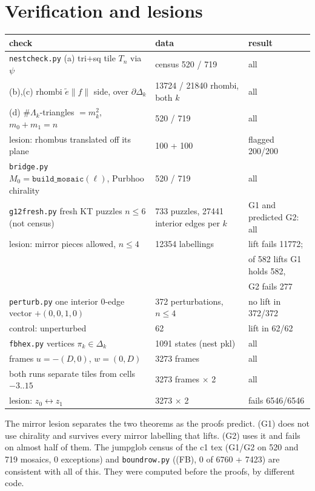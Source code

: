 \documentclass[11pt]{article}
\theoremstyle{definition}\newtheorem{definition}[theorem]{Definition}\newtheorem{remark}[theorem]{Remark}
\begin{document}
\section{Verification and lesions}\label{sec:ver}
\begin{center}\small
\begin{tabular}{lll}
\toprule
check & data & result\\
\midrule
\texttt{nestcheck.py} (a) tri+sq tile $T_n$ via $\psi$ & census 520 / 719 & all\\
\quad (b),(c) rhombi $\tilde e\parallel f\parallel$ side, over $\partial\Delta_k$ & 13724 / 21840 rhombi, both $k$ & all\\
\quad (d) $\#\Lambda_k$-triangles $=m_k^2$, $m_0+m_1=n$ & 520 / 719 & all\\
\quad lesion: rhombus translated off its plane & 100 + 100 & flagged 200/200\\
\texttt{bridge.py} $M_0=\texttt{build\_mosaic}(\ell)$, Purbhoo chirality & 520 / 719 & all\\
\texttt{g12fresh.py} fresh KT puzzles $n\le6$ (not census) & 733 puzzles, 27441 interior edges per $k$ & G1 and predicted G2: all\\
\quad lesion: mirror pieces allowed, $n\le4$ & 12354 labellings & lift fails 11772;\\
& & of 582 lifts G1 holds 582,\\ & & G2 fails 277\\
\texttt{perturb.py} one interior 0-edge vector $+(0,0,1,0)$ & 372 perturbations, $n\le4$ & no lift in 372/372\\
\quad control: unperturbed & 62 & lift in 62/62\\
\texttt{fbhex.py} vertices $\pi_k\in\Delta_k$ & 1091 states (nest pkl) & all\\
\quad frames $u=-(D,0)$, $w=(0,D)$ & 3273 frames & all\\
\quad both runs separate tiles from cells $-3..15$ & 3273 frames $\times$ 2 & all\\
\quad lesion: $z_0\leftrightarrow z_1$ & 3273 $\times$ 2 & fails 6546/6546\\
\bottomrule
\end{tabular}\end{center}
The mirror lesion separates the two theorems as the proofs predict. (G1) does not use chirality and survives every mirror labelling that lifts. (G2) uses it and fails on almost half of them. The jumpglob census of the c1 tex (G1/G2 on 520 and 719 mosaics, 0 exceptions) and \texttt{boundrow.py} ((FB), 0 of 6760 + 7423) are consistent with all of this. They were computed before the proofs, by different code.
\end{document}
